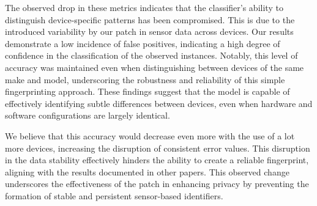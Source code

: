\documentclass[11pt,
  oneside,openany,    %
]{scrreprt}
\begin{document}
The observed drop in these metrics indicates that the classifier's ability to distinguish device-specific patterns has been compromised.
This is due to the introduced variability by our patch in sensor data across devices.
Our results demonstrate a low incidence of false positives, indicating a high degree of confidence in the classification of the observed instances.
Notably, this level of accuracy was maintained even when distinguishing between devices of the same make and model, underscoring the robustness and reliability of this simple fingerprinting approach.
These findings suggest that the model is capable of effectively identifying subtle differences between devices, even when hardware and software configurations are largely identical.

We believe that this accuracy would decrease even more with the use of a lot more devices, increasing the disruption of consistent error values.
This disruption in the data stability effectively hinders the ability to create a reliable fingerprint, aligning with the results documented in other papers.
This observed change underscores the effectiveness of the patch in enhancing privacy by preventing the formation of stable and persistent sensor-based identifiers.

\begin{table}[h]
  \centering
  \captionsetup{justification=centering}
  \quad
  \quad
  \caption{The performance outcomes of the KNN classifier over the test dataset.}
  \label{tab:knn_results}
\end{table}
\end{document}
